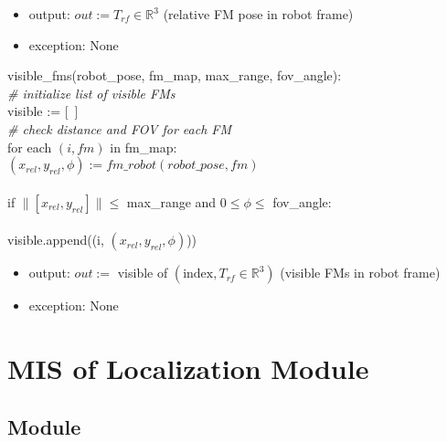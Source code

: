 \documentclass[12pt, titlepage]{article}
\begin{document}
\begin{itemize}
  \item output: $out := T_{rf} \in \mathbb{R}^3$ (relative FM pose in robot frame)
  \item exception: None
\end{itemize}


\noindent visible\_fms(robot\_pose, fm\_map, max\_range, fov\_angle): \\

\noindent \textit{\# initialize list of visible FMs} \\
visible := [~] \\

\noindent \textit{\# check distance and FOV for each FM} \\
for each $(i, fm)$ in fm\_map: \\
\hspace*{1em} $(x_{rel}, y_{rel}, \phi) := fm\_robot(robot\_pose, fm)$ \\\\
\hspace*{1em} if $\|[x_{rel}, y_{rel}]\| \leq$ max\_range and $0 \leq \phi \leq$ fov\_angle: \\\\
\hspace*{2em} visible.append((i, $(x_{rel}, y_{rel}, \phi)$)) 

\begin{itemize}
  \item output: $out :=$ visible of $(\text{index}, T_{rf} \in \mathbb{R}^3)$ (visible FMs in robot frame)
  \item exception: None
\end{itemize}



\newpage

\section{MIS of Localization Module} \label{M_Localize}

\subsection{Module}
\end{document}
